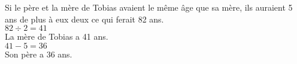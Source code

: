 \exo{}
Si le père et la mère de Tobias avaient le même âge que sa mère, ils auraient 5 ans de plus à eux deux ce qui ferait 82 ans.\\
$82 \div 2=41$\\
La mère de Tobias a 41 ans.\\
$41 - 5 = 36$\\
Son père a 36 ans. 